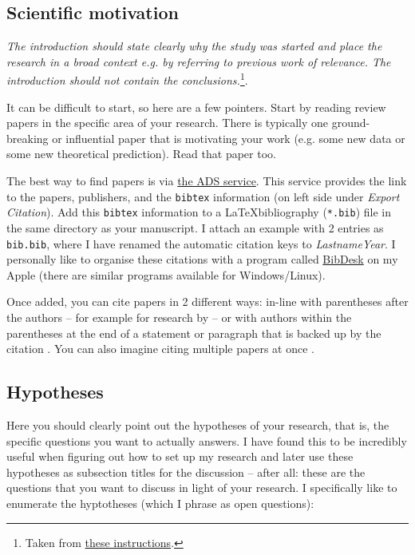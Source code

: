 \documentclass[twocolumn,apj,numberedappendix,appendixfloats]{openjournal}
\begin{document}
\subsection{Scientific motivation}

\textit{The introduction should state clearly why the study was started and place the research in a broad context e.g. by referring to previous work of relevance. The introduction should not contain the conclusions.}\footnote{Taken from \href{https://www.aanda.org/doc_journal/instructions/aadoc.pdf}{these instructions}.}.

It can be difficult to start, so here are a few pointers. Start by reading review papers in the specific area of your research. There is typically one ground-breaking or influential paper that is motivating your work (e.g. some new data or some new theoretical prediction). Read that paper too.

The best way to find papers is via \href{https://ui.adsabs.harvard.edu}{the ADS service}. This service provides the link to the papers, publishers, and the \texttt{bibtex} information (on left side under \textit{Export Citation}). Add this \texttt{bibtex} information to a \LaTeX bibliography (\texttt{*.bib}) file in the same directory as your manuscript. I attach an example with 2 entries as \texttt{bib.bib}, where I have renamed the automatic citation keys to \textit{LastnameYear}. I personally like to organise these citations with a program called \href{https://bibdesk.sourceforge.io}{BibDesk} on my Apple (there are similar programs available for Windows/Linux).

Once added, you can cite papers in 2 different ways: in-line with parentheses after the authors -- for example for research by \citet{Buder2024b} -- or with authors within the parentheses at the end of a statement or paragraph that is backed up by the citation \citep{Buder2024b}. You can also imagine citing multiple papers at once \citep[e.g.][]{Buder2018, Buder2019, Buder2021, Buder2022, Buder2024b}.

\subsection{Hypotheses} \label{sec:hypotheses}

Here you should clearly point out the hypotheses of your research, that is, the specific questions you want to actually answers. I have found this to be incredibly useful when figuring out how to set up my research and later use these hypotheses as subsection titles for the discussion -- after all: these are the questions that you want to discuss in light of your research. I specifically like to enumerate the hyptotheses (which I phrase as open questions):
\end{document}
